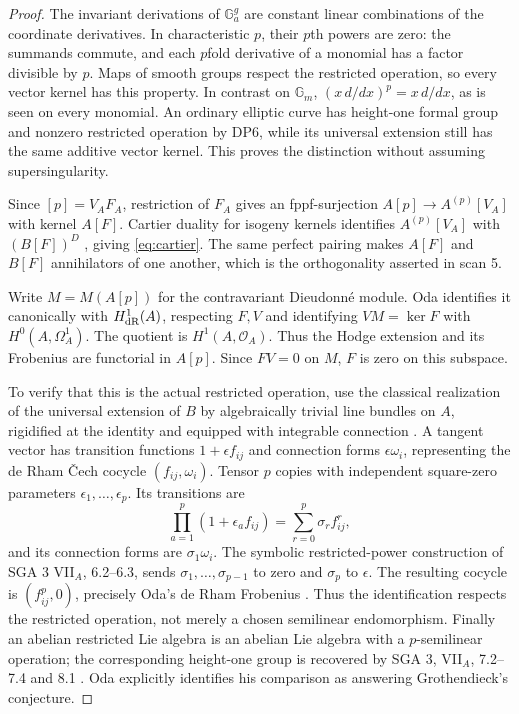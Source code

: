 \documentclass[11pt,a4paper]{article}
\theoremstyle{definition}\newtheorem{remark}[theorem]{Remark}
\newcommand{\Ga}{\mathbb G_a}\newcommand{\Gm}{\mathbb G_m}
\begin{document}
\begin{proof}
The invariant derivations of $\Ga^g$ are constant linear combinations of the coordinate derivatives. In characteristic $p$, their $p$th powers are zero: the summands commute, and each $p$fold derivative of a monomial has a factor divisible by $p$. Maps of smooth groups respect the restricted operation, so every vector kernel has this property. In contrast on $\Gm$, $(x\,d/dx)^p=x\,d/dx$, as is seen on every monomial. An ordinary elliptic curve has height-one formal group and nonzero restricted operation by DP6, while its universal extension still has the same additive vector kernel. This proves the distinction without assuming supersingularity.

Since $[p]=V_AF_A$, restriction of $F_A$ gives an fppf-surjection $A[p]\to A^{(p)}[V_A]$ with kernel $A[F]$. Cartier duality for isogeny kernels identifies $A^{(p)}[V_A]$ with $(B[F])^D$ \cite[Theorem 1.1 and Corollary 1.3, pp.~67--70]{Oda}, giving \eqref{eq:cartier}. The same perfect pairing makes $A[F]$ and $B[F]$ annihilators of one another, which is the orthogonality asserted in scan 5.

Write $M=M(A[p])$ for the contravariant Dieudonn\'e module. Oda \cite[Corollary 5.11, p.~131]{Oda} identifies it canonically with $H^1_{\mathrm{dR}}(A)$, respecting $F,V$ and identifying $VM=\ker F$ with $H^0(A,\Omega_A^1)$. The quotient is $H^1(A,\mathcal O_A)$. Thus the Hodge extension and its Frobenius are functorial in $A[p]$. Since $FV=0$ on $M$, $F$ is zero on this subspace.

To verify that this is the actual restricted operation, use the classical realization of the universal extension of $B$ by algebraically trivial line bundles on $A$, rigidified at the identity and equipped with integrable connection \cite[Chapter I, 2.6; Propositions 2.6.7, 3.2.3, 4.2.1; (4.6.3)]{MM}. A tangent vector has transition functions $1+\epsilon f_{ij}$ and connection forms $\epsilon\omega_i$, representing the de Rham \v Cech cocycle $(f_{ij},\omega_i)$. Tensor $p$ copies with independent square-zero parameters $\epsilon_1,\ldots,\epsilon_p$. Its transitions are
\[
 \prod_{a=1}^p(1+\epsilon_af_{ij})=\sum_{r=0}^p\sigma_rf_{ij}^r,
\]
and its connection forms are $\sigma_1\omega_i$. The symbolic restricted-power construction of SGA 3 VII$_A$, 6.2--6.3, sends $\sigma_1,\ldots,\sigma_{p-1}$ to zero and $\sigma_p$ to $\epsilon$. The resulting cocycle is $(f_{ij}^p,0)$, precisely Oda's de Rham Frobenius \cite[Definition 5.3]{Oda}. Thus the identification respects the restricted operation, not merely a chosen semilinear endomorphism. Finally an abelian restricted Lie algebra is an abelian Lie algebra with a $p$-semilinear operation; the corresponding height-one group is recovered by SGA 3, VII$_A$, 7.2--7.4 and 8.1 \cite{SGA3}. Oda explicitly identifies his comparison as answering Grothendieck's conjecture.
\end{proof}
\end{document}
